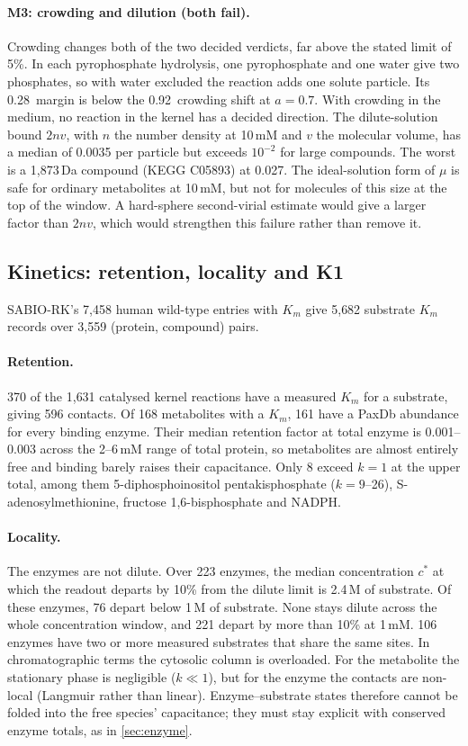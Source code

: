 \paragraph{M3: crowding and dilution (both fail).}
Crowding changes both of the two decided verdicts, far above the stated limit of 5\%.
In each pyrophosphate hydrolysis, one pyrophosphate and one water give two phosphates, so with water excluded the reaction adds one solute particle.
Its 0.28\kJ\ margin is below the 0.92\kJ\ crowding shift at $a=0.7$.
With crowding in the medium, no reaction in the kernel has a decided direction.
The dilute-solution bound $2nv$, with $n$ the number density at 10\,mM and $v$ the molecular volume, has a median of 0.0035 per particle but exceeds $10^{-2}$ for large compounds.
The worst is a 1{,}873\,Da compound (KEGG C05893) at 0.027.
The ideal-solution form of $\mu$ is safe for ordinary metabolites at 10\,mM, but not for molecules of this size at the top of the window.
A hard-sphere second-virial estimate would give a larger factor than $2nv$, which would strengthen this failure rather than remove it.

\subsection{Kinetics: retention, locality and K1}
\label{sec:res-kinetics}

SABIO-RK's 7{,}458 human wild-type entries with $K_m$ give 5{,}682 substrate $K_m$ records over 3{,}559 (protein, compound) pairs.

\paragraph{Retention.}
370 of the 1{,}631 catalysed kernel reactions have a measured $K_m$ for a substrate, giving 596 contacts.
Of 168 metabolites with a $K_m$, 161 have a PaxDb abundance for every binding enzyme.
Their median retention factor at total enzyme is 0.001--0.003 across the 2--6\,mM range of total protein, so metabolites are almost entirely free and binding barely raises their capacitance.
Only 8 exceed $k=1$ at the upper total, among them 5-diphosphoinositol pentakisphosphate ($k=9$--26), S-adenosylmethionine, fructose 1,6-bisphosphate and NADPH.

\paragraph{Locality.}
The enzymes are not dilute.
Over 223 enzymes, the median concentration $c^\ast$ at which the readout departs by 10\% from the dilute limit is 2.4\,\textmu M of substrate.
Of these enzymes, 76 depart below 1\,\textmu M of substrate.
None stays dilute across the whole concentration window, and 221 depart by more than 10\% at 1\,mM.
106 enzymes have two or more measured substrates that share the same sites.
In chromatographic terms the cytosolic column is overloaded.
For the metabolite the stationary phase is negligible ($k\ll1$), but for the enzyme the contacts are non-local (Langmuir rather than linear).
Enzyme--substrate states therefore cannot be folded into the free species' capacitance; they must stay explicit with conserved enzyme totals, as in \cref{sec:enzyme}.


